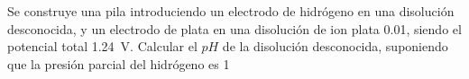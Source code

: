 Se construye una pila introduciendo un electrodo de hidrógeno en una disolución desconocida, y un electrodo de plata en una disolución de ion plata \SI{0,01}{\Molar}, siendo el potencial total \SI{1,24}{\volt}. Calcular el $pH$ de la disolución desconocida, suponiendo que la presión parcial del hidrógeno es \SI{1}{\atm}
